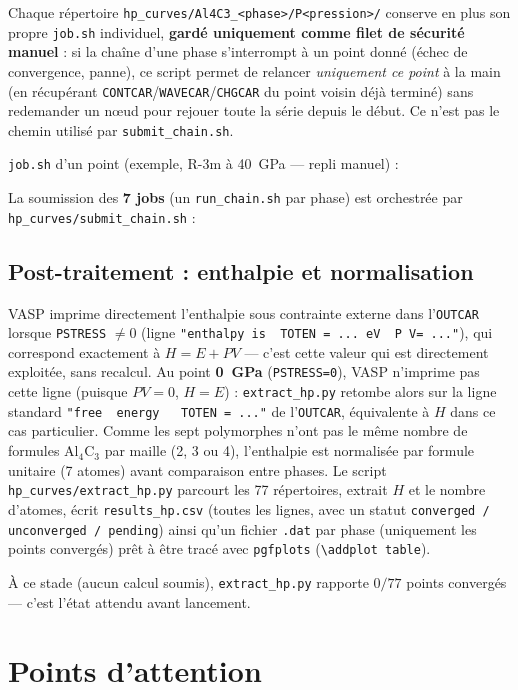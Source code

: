 \documentclass[11pt,a4paper]{article}
\begin{document}
Chaque répertoire \texttt{hp\_curves/Al4C3\_<phase>/P<pression>/} conserve en plus son propre
\texttt{job.sh} individuel, \textbf{gardé uniquement comme filet de sécurité manuel} : si la
chaîne d'une phase s'interrompt à un point donné (échec de convergence, panne), ce script
permet de relancer \emph{uniquement ce point} à la main (en récupérant
\texttt{CONTCAR}/\texttt{WAVECAR}/\texttt{CHGCAR} du point voisin déjà terminé) sans redemander
un nœud pour rejouer toute la série depuis le début. Ce n'est pas le chemin utilisé par
\texttt{submit\_chain.sh}.

\texttt{job.sh} d'un point (exemple, R-3m à 40~GPa — repli manuel) :


La soumission des \textbf{7 jobs} (un \texttt{run\_chain.sh} par phase) est orchestrée par
\texttt{hp\_curves/submit\_chain.sh} :


\subsection{Post-traitement : enthalpie et normalisation}

VASP imprime directement l'enthalpie sous contrainte externe dans l'\texttt{OUTCAR} lorsque
\texttt{PSTRESS} $\neq 0$ (ligne \texttt{"enthalpy is~~TOTEN~=~... eV~~P~V=~..."}), qui
correspond exactement à $H = E + PV$ — c'est cette valeur qui est directement exploitée, sans
recalcul. Au point \textbf{0~GPa} (\texttt{PSTRESS=0}), VASP n'imprime pas cette ligne
(puisque $PV=0$, $H=E$) : \texttt{extract\_hp.py} retombe alors sur la ligne standard
\texttt{"free~~energy~~~TOTEN~=~..."} de l'\texttt{OUTCAR}, équivalente à $H$ dans ce cas
particulier. Comme les sept polymorphes n'ont pas le même nombre de formules Al$_4$C$_3$ par
maille (2, 3 ou 4), l'enthalpie est normalisée par formule unitaire (7 atomes) avant
comparaison entre phases. Le script \texttt{hp\_curves/extract\_hp.py} parcourt les 77
répertoires, extrait $H$ et le nombre d'atomes, écrit \texttt{results\_hp.csv} (toutes les
lignes, avec un statut \texttt{converged / unconverged / pending}) ainsi qu'un fichier
\texttt{.dat} par phase (uniquement les points convergés) prêt à être tracé avec
\texttt{pgfplots} (\texttt{\textbackslash addplot table}).

À ce stade (aucun calcul soumis), \texttt{extract\_hp.py} rapporte $0/77$ points convergés —
c'est l'état attendu avant lancement.

\section{Points d'attention}
\end{document}

